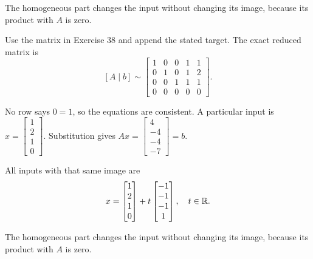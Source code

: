 The homogeneous part changes the input without changing its image, because its product with $A$ is zero.



Use the matrix in Exercise 38 and append the stated target. The exact reduced matrix is
\[ [A\mid b]\sim \begin{bmatrix}1 & 0 & 0 & 1 & 1\\0 & 1 & 0 & 1 & 2\\0 & 0 & 1 & 1 & 1\\0 & 0 & 0 & 0 & 0\end{bmatrix}.\]

No row says $0=1$, so the equations are consistent. A particular input is $x=\begin{bmatrix}1\\2\\1\\0\end{bmatrix}$. Substitution gives $Ax=\begin{bmatrix}4\\-4\\-4\\-7\end{bmatrix}=b$.

All inputs with that same image are
\[ x=\begin{bmatrix}1\\2\\1\\0\end{bmatrix}+t\begin{bmatrix}-1\\-1\\-1\\1\end{bmatrix},\quad t\in\mathbb{R}.\]

The homogeneous part changes the input without changing its image, because its product with $A$ is zero.
